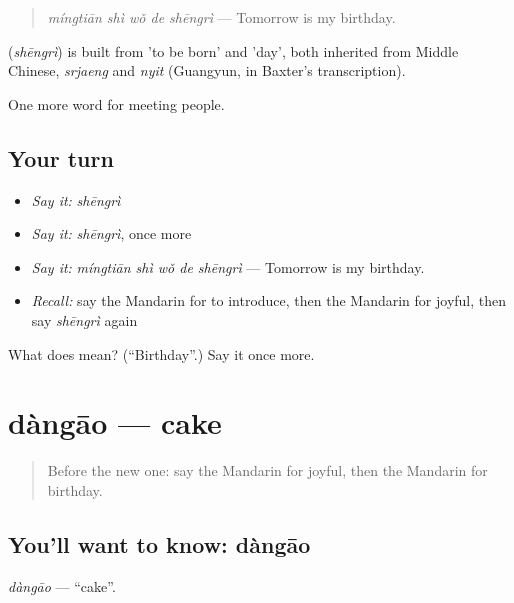 \begin{quote}
\textbf{} \emph{míngtiān shì wǒ de shēngrì} — Tomorrow is my birthday.
\end{quote}

\begin{cousinweb}
\textbf{} (\emph{shēngrì}) is built from  'to be born' and  'day', both inherited from Middle Chinese, \emph{srjaeng} and \emph{nyit} (Guangyun, in Baxter's transcription).
\end{cousinweb}

\begin{grammarlens}[title={What you've built}]
One more word for meeting people.
\end{grammarlens}

\subsection*{Your turn}
\begin{itemize}
\raggedright
  \item \emph{Say it:} \emph{shēngrì}
  \item \emph{Say it:} \emph{shēngrì}, once more
  \item \emph{Say it:} \emph{míngtiān shì wǒ de shēngrì} — Tomorrow is my birthday.
  \item \emph{Recall:} say the Mandarin for to introduce, then the Mandarin for joyful, then say \emph{shēngrì} again
\end{itemize}

\begin{tcolorbox}[breakable,colback=teal!4,colframe=teal!35!black,title={Before you move on}]
What does  mean? (\textquotedblleft{}Birthday\textquotedblright{}.) Say it once more.
\end{tcolorbox}
\section[dàngāo]{dàngāo — cake}

\label{lesson:ZH-C75-dangao}



\begin{quote}
Before the new one: say the Mandarin for joyful, then the Mandarin for birthday.
\end{quote}

\subsection*{You'll want to know: dàngāo}
\emph{dàngāo} — \textquotedblleft{}cake\textquotedblright{}.

